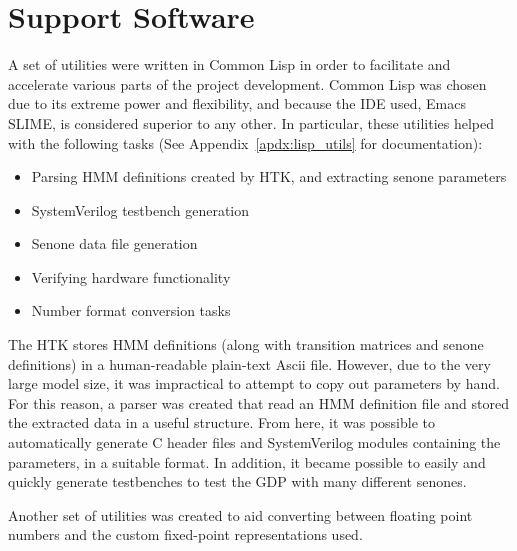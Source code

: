 

\section{Support Software} %
\label{sec:support_software}
	A set of utilities were written in Common Lisp in order to facilitate and accelerate various parts of the project development.  Common Lisp was chosen due to its extreme power and flexibility, and because the IDE used, Emacs SLIME, is considered superior to any other.  In particular, these utilities helped with the following tasks (See Appendix~\ref{apdx:lisp_utils} for documentation):
	\begin{itemize}
		\item Parsing HMM definitions created by HTK, and extracting senone parameters
		\item SystemVerilog testbench generation
		\item Senone data file generation
		\item Verifying hardware functionality
		\item Number format conversion tasks
	\end{itemize}

	The HTK stores HMM definitions (along with transition matrices and senone definitions) in a human-readable plain-text Ascii file.  However, due to the very large model size, it was impractical to attempt to copy out parameters by hand.  For this reason, a parser was created that read an HMM definition file and stored the extracted data in a useful structure.  From here, it was possible to automatically generate C header files and SystemVerilog modules containing the parameters, in a suitable format.  In addition, it became possible to easily and quickly generate testbenches to test the GDP with many different senones.

	Another set of utilities was created to aid converting between floating point numbers and the custom fixed-point representations used.

